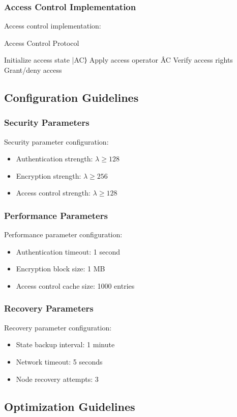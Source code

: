 \documentclass[12pt]{article}
\begin{document}
\subsubsection{Access Control Implementation}
Access control implementation:
\begin{algorithm}
\caption{Access Control Protocol}
\begin{algorithmic}
\STATE Initialize access state |AC⟩
\STATE Apply access operator ÂC
\STATE Verify access rights
\STATE Grant/deny access
\end{algorithmic}
\end{algorithm}
\subsection{Configuration Guidelines}
\subsubsection{Security Parameters}
Security parameter configuration:
\begin{itemize}
\item Authentication strength: $\lambda \geq 128$
\item Encryption strength: $\lambda \geq 256$
\item Access control strength: $\lambda \geq 128$
\end{itemize}
\subsubsection{Performance Parameters}
Performance parameter configuration:
\begin{itemize}
\item Authentication timeout: 1 second
\item Encryption block size: 1 MB
\item Access control cache size: 1000 entries
\end{itemize}
\subsubsection{Recovery Parameters}
Recovery parameter configuration:
\begin{itemize}
\item State backup interval: 1 minute
\item Network timeout: 5 seconds
\item Node recovery attempts: 3
\end{itemize}
\subsection{Optimization Guidelines}
\end{document}

